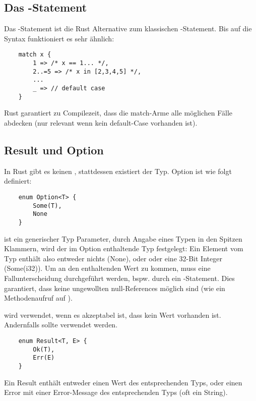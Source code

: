 \subsection{Das -Statement}

Das -Statement ist die Rust Alternative zum klassischen -Statement. Bis auf die Syntax funktioniert es sehr ähnlich:

\begin{verbatim}
    match x {
        1 => /* x == 1... */,
        2..=5 => /* x in [2,3,4,5] */,
        ...
        _ => // default case
    }
\end{verbatim}

Rust garantiert zu Compilezeit, dass die match-Arme alle möglichen Fälle abdecken (nur relevant wenn kein default-Case vorhanden ist).

\subsection{Result und Option}

In Rust gibt es keinen , stattdessen existiert der  Typ. Option ist wie folgt definiert:

\begin{verbatim}
    enum Option<T> {
        Some(T),
        None
    }
\end{verbatim}

 ist ein generischer Typ Parameter, durch Angabe eines Typen in den Spitzen Klammern, wird der im Option enthaltende Typ festgelegt:
Ein Element vom Typ  enthält also entweder nichts (None), oder oder eine 32-Bit Integer (Some(i32)). Um an den enthaltenden Wert zu kommen, muss eine Fallunterscheidung durchgeführt werden, bspw. durch ein -Statement. Dies garantiert, dass keine ungewollten null-References möglich sind (wie \zB ein Methodenaufruf auf ).

 wird verwendet, wenn es akzeptabel ist, dass kein Wert vorhanden ist. Andernfalls sollte  verwendet werden.

\begin{verbatim}
    enum Result<T, E> {
        Ok(T),
        Err(E)
    }
\end{verbatim}

Ein Result enthält entweder einen Wert des entsprechenden Typs, oder einen Error mit einer Error-Message des entsprechenden Typs (oft ein String).


